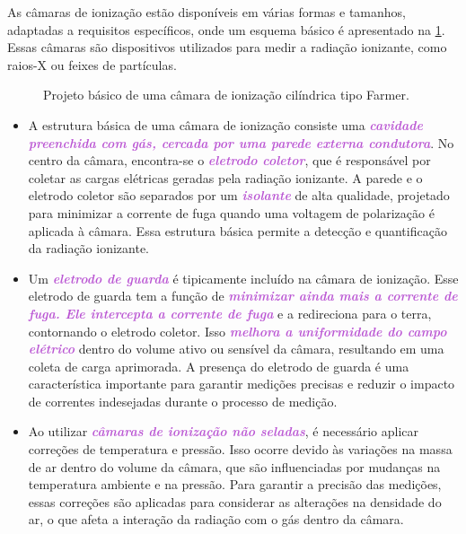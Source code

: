 \documentclass[11pt,a4paper]{article}
\begin{document}
	As câmaras de ionização estão disponíveis em várias formas e tamanhos, adaptadas a requisitos específicos, onde um esquema básico é apresentado na \ref{fig:}. Essas câmaras são dispositivos utilizados para medir a radiação ionizante, como raios-X ou feixes de partículas.

		\begin{figure}[h]
			\centering
			\caption{Projeto básico de uma câmara de ionização cilíndrica tipo Farmer.}
			\label{fig:}
		\end{figure}
		
	\begin{itemize}
		\item A estrutura básica de uma câmara de ionização consiste uma \textcolor{MediumOrchid}{\textit{\textbf{cavidade preenchida com gás, cercada por uma parede externa condutora}}}. No centro da câmara, encontra-se o \textcolor{MediumOrchid}{\textit{\textbf{eletrodo coletor}}}, que é responsável por coletar as cargas elétricas geradas pela radiação ionizante. A parede e o eletrodo coletor são separados por um \textcolor{MediumOrchid}{\textit{\textbf{isolante}}} de alta qualidade, projetado para minimizar a corrente de fuga quando uma voltagem de polarização é aplicada à câmara. Essa estrutura básica permite a detecção e quantificação da radiação ionizante.
		\item Um \textcolor{MediumOrchid}{\textit{\textbf{eletrodo de guarda}}} é tipicamente incluído na câmara de ionização. Esse eletrodo de guarda tem a função de \textcolor{MediumOrchid}{\textit{\textbf{minimizar ainda mais a corrente de fuga. Ele intercepta a corrente de fuga}}} e a redireciona para o terra, contornando o eletrodo coletor. Isso \textcolor{MediumOrchid}{\textit{\textbf{melhora a uniformidade do campo elétrico}}} dentro do volume ativo ou sensível da câmara, resultando em uma coleta de carga aprimorada. A presença do eletrodo de guarda é uma característica importante para garantir medições precisas e reduzir o impacto de correntes indesejadas durante o processo de medição.
		\item Ao utilizar \textcolor{MediumOrchid}{\textit{\textbf{câmaras de ionização não seladas}}}, é necessário aplicar correções de temperatura e pressão. Isso ocorre devido às variações na massa de ar dentro do volume da câmara, que são influenciadas por mudanças na temperatura ambiente e na pressão. Para garantir a precisão das medições, essas correções são aplicadas para considerar as alterações na densidade do ar, o que afeta a interação da radiação com o gás dentro da câmara.
	\end{itemize}
\end{document}
